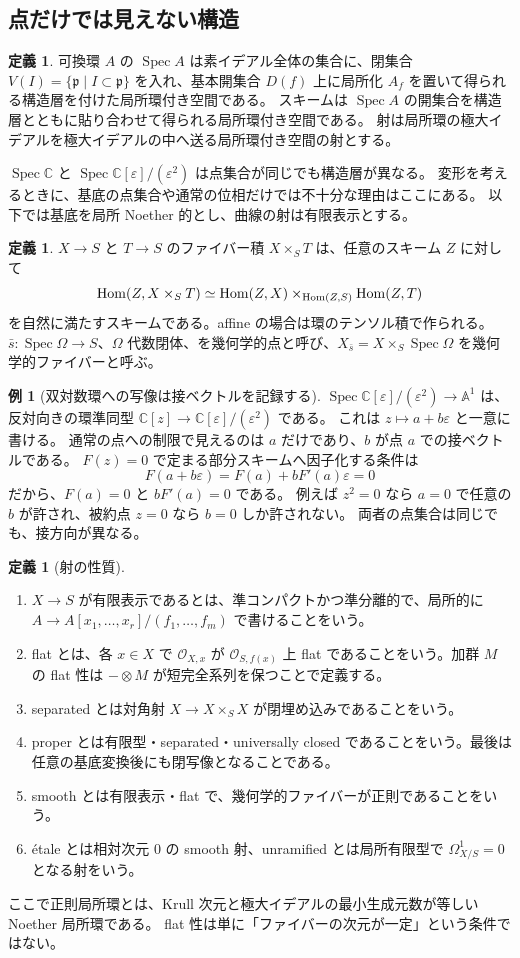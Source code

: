\documentclass[dvipdfmx,a4paper,11pt]{article}
\theoremstyle{definition}
\newtheorem{dfn}[thm]{定義}
\newtheorem{exa}[thm]{例}
\newcommand{\C}{\mathbb C}\newcommand{\R}{\mathbb R}\newcommand{\Z}{\mathbb Z}\newcommand{\Q}{\mathbb Q}
\newcommand{\OO}{\mathcal O}\newcommand{\MM}{\mathcal M}\newcommand{\TT}{\mathcal T}
\DeclareMathOperator{\Spec}{Spec}\DeclareMathOperator{\Proj}{Proj}\DeclareMathOperator{\GL}{GL}
\newcommand{\A}{\mathbb A}
\newcommand{\eps}{\varepsilon}
\begin{document}
\subsection{点だけでは見えない構造}
\begin{dfn}
可換環 $A$ の $\Spec A$ は素イデアル全体の集合に、閉集合 $V(I)=\{\mathfrak p\mid I\subset\mathfrak p\}$ を入れ、基本開集合 $D(f)$ 上に局所化 $A_f$ を置いて得られる構造層を付けた局所環付き空間である。
スキームは $\Spec A$ の開集合を構造層とともに貼り合わせて得られる局所環付き空間である。
射は局所環の極大イデアルを極大イデアルの中へ送る局所環付き空間の射とする。
\end{dfn}
$\Spec\C$ と $\Spec\C[\eps]/(\eps^2)$ は点集合が同じでも構造層が異なる。
変形を考えるときに、基底の点集合や通常の位相だけでは不十分な理由はここにある。
以下では基底を局所 Noether 的とし、曲線の射は有限表示とする。
\begin{dfn}
$X\to S$ と $T\to S$ のファイバー積 $X\times_ST$ は、任意のスキーム $Z$ に対して
\[
\operatorname{Hom}(Z,X\times_ST)\simeq\operatorname{Hom}(Z,X)\times_{\operatorname{Hom}(Z,S)}\operatorname{Hom}(Z,T)
\]
を自然に満たすスキームである。affine の場合は環のテンソル積で作られる。
$\bar s:\Spec\Omega\to S$、$\Omega$ 代数閉体、を幾何学的点と呼び、$X_{\bar s}=X\times_S\Spec\Omega$ を幾何学的ファイバーと呼ぶ。
\end{dfn}
\begin{exa}[双対数環への写像は接ベクトルを記録する]
$\Spec\C[\eps]/(\eps^2)\to\A^1$ は、反対向きの環準同型
$\C[z]\to\C[\eps]/(\eps^2)$ である。
これは $z\mapsto a+b\eps$ と一意に書ける。
通常の点への制限で見えるのは $a$ だけであり、$b$ が点 $a$ での接ベクトルである。
$F(z)=0$ で定まる部分スキームへ因子化する条件は
\[
F(a+b\eps)=F(a)+bF'(a)\eps=0
\]
だから、$F(a)=0$ と $bF'(a)=0$ である。
例えば $z^2=0$ なら $a=0$ で任意の $b$ が許され、被約点 $z=0$ なら $b=0$ しか許されない。
両者の点集合は同じでも、接方向が異なる。
\end{exa}

\begin{dfn}[射の性質]
\leavevmode
\begin{enumerate}
\item $X\to S$ が有限表示であるとは、準コンパクトかつ準分離的で、局所的に $A\to A[x_1,\ldots,x_r]/(f_1,\ldots,f_m)$ で書けることをいう。
\item flat とは、各 $x\in X$ で $\OO_{X,x}$ が $\OO_{S,f(x)}$ 上 flat であることをいう。加群 $M$ の flat 性は $-\otimes M$ が短完全系列を保つことで定義する。
\item separated とは対角射 $X\to X\times_SX$ が閉埋め込みであることをいう。
\item proper とは有限型・separated・universally closed であることをいう。最後は任意の基底変換後にも閉写像となることである。
\item smooth とは有限表示・flat で、幾何学的ファイバーが正則であることをいう。
\item étale とは相対次元 $0$ の smooth 射、unramified とは局所有限型で $\Omega^1_{X/S}=0$ となる射をいう。
\end{enumerate}
\end{dfn}
ここで正則局所環とは、Krull 次元と極大イデアルの最小生成元数が等しい Noether 局所環である。
flat 性は単に「ファイバーの次元が一定」という条件ではない。
\end{document}

